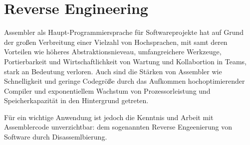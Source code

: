 \section{Reverse Engineering}

Assembler als Haupt-Programmiersprache für Softwareprojekte hat auf Grund der großen Verbreitung einer Vielzahl von Hochsprachen, mit samt deren Vorteilen wie höheres Abstraktionsnieveau, umfangreichere Werkzeuge, Portierbarkeit und Wirtschaftlichkeit von Wartung und Kollabortion in Teams, stark an Bedeutung verloren. Auch sind die Stärken von Assembler wie Schnelligkeit und geringe Codegröße durch das Aufkommen hochoptimierender Compiler und exponentiellem Wachstum von Prozessorleistung und Speicherkapazität in den Hintergrund getreten.

Für ein wichtige Anwendung ist jedoch die Kenntnis und Arbeit mit Assemblercode unverzichtbar: dem sogenannten Reverse Engeenierung von Software durch Disassemlbierung.